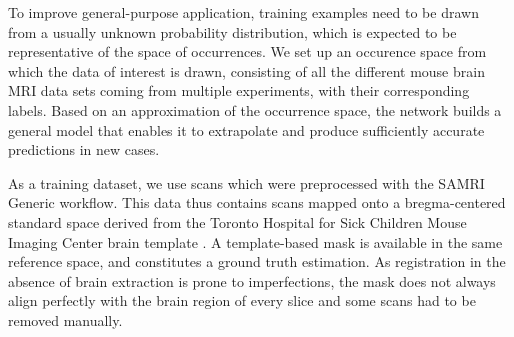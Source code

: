To improve general-purpose application, training examples need to be drawn from a usually unknown probability distribution, which is expected to be representative of the space of occurrences.
We set up an occurence space from which the data of interest is drawn, consisting of all the different mouse brain MRI data sets coming from multiple experiments, with their corresponding labels.
Based on an approximation of the occurrence space, the network builds a general model that enables it to extrapolate and produce sufficiently accurate predictions in new cases.

As a training dataset, we use scans which were preprocessed with the SAMRI Generic workflow.
This data thus contains scans mapped onto a bregma-centered standard \cite{ioanas_optimized_2019} space derived from the Toronto Hospital for Sick Children Mouse Imaging Center brain template \cite{dsu}.
A template-based mask is available in the same reference space, and constitutes a ground truth estimation.
As registration in the absence of brain extraction is prone to imperfections, the mask does not always align perfectly with the brain region of every slice and some scans had to be removed manually.
